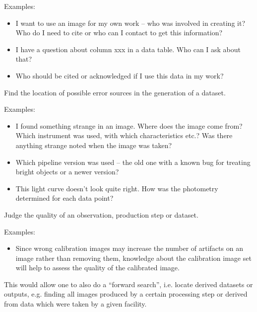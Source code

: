        \noindent Examples: 
        \begin{itemize}
            \item I want to use an image for my own work -- who was involved in
creating it? Who do I need to cite or who can I contact to get this information?  
            \item I have a question about column xxx in a data
table. Who can I ask about that?  
            \item Who should be cited or acknowledged if I use this data in my work?
        \end{itemize}


        Find the location of possible error sources in the generation of a dataset.

        \noindent Examples:
        \begin{itemize}
            \item I found something strange in an image. Where does
the image come from? Which instrument was used, with which characteristics
etc.? Was there anything strange noted when the image was taken?  
            \item Which pipeline version was used -- the old one
with a known bug for treating bright objects or a newer version?  
            \item This light curve doesn't look quite right. How was
the photometry determined for each data point?  
        \end{itemize}


        Judge the quality of an observation, production step or dataset.
        
        \noindent Examples:
        \begin{itemize}
            \item Since wrong calibration images may increase the
number of artifacts on an image rather than removing them, knowledge about
the calibration image set will help to assess the quality of the calibrated
image.  
        \end{itemize}
      

        This would allow one to also do a ``forward search'', i.e. locate derived datasets or outputs, e.g. finding all images produced by a certain processing step or derived from data which were taken by a given facility.
        
